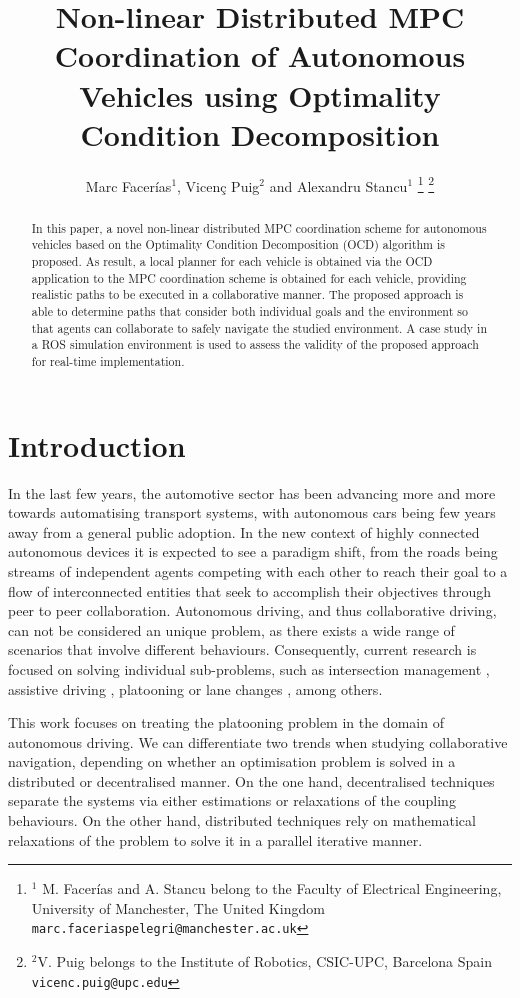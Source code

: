 \documentclass[letterpaper, 10 pt, conference]{ieeeconf}  %
\title{\LARGE \bf
 Non-linear Distributed MPC Coordination of Autonomous Vehicles using Optimality Condition Decomposition
}
\author{Marc Facerías$^{1}$, Vicenç Puig$^{2}$ and Alexandru Stancu$^{1}$%
\thanks{$^{1}$ M. Facerías and A. Stancu belong to the Faculty of Electrical Engineering,
        University of Manchester, The United Kingdom
        {\tt\small marc.faceriaspelegri@manchester.ac.uk}}%
\thanks{$^{2}$V. Puig belongs to the Institute of Robotics, CSIC-UPC, Barcelona
        Spain
        {\tt\small vicenc.puig@upc.edu}}%
}
\begin{document}
\maketitle
\thispagestyle{empty}
\pagestyle{empty}


\begin{abstract}
In this paper, a novel non-linear distributed MPC coordination scheme for autonomous vehicles based on the Optimality Condition Decomposition (OCD) algorithm is proposed. 
As result, a local planner for each vehicle is obtained via the OCD application to the MPC coordination scheme is obtained for each vehicle, providing realistic paths to be executed in a collaborative manner. The proposed approach is able to determine paths that consider both individual goals and the environment so that agents can collaborate to safely navigate the studied environment. A case study in a ROS simulation environment is used to assess the validity of the proposed approach for real-time implementation.
\end{abstract}


\section{Introduction}
\label{seq:Intro}
In the last few years, the automotive sector has been advancing more and more towards automatising transport systems, with autonomous cars being few years away from a general public adoption. In the new context of highly connected autonomous devices it is expected to see a paradigm shift, from the roads being streams of independent agents competing with each other to reach their goal to a flow of interconnected entities that seek to accomplish their objectives through peer to peer collaboration. Autonomous driving, and thus collaborative driving, can not be considered an unique problem, as there exists a wide range of scenarios that involve different behaviours. Consequently, current research is focused on solving individual sub-problems, such as intersection management \cite{Pei2021}, assistive driving \cite{medero2021control}, platooning \cite{Vlachos2022} or lane changes \cite{LaneChangeXie2021}, among others. 

This work focuses on treating the platooning problem in the domain of autonomous driving. We can differentiate two trends when studying collaborative navigation, depending on whether an optimisation problem is solved in a distributed or decentralised manner. On the one hand, decentralised techniques separate the systems via either estimations or relaxations of the coupling behaviours. On the other hand, distributed techniques rely on mathematical relaxations of the problem to solve it in a parallel iterative manner. 
\end{document}
